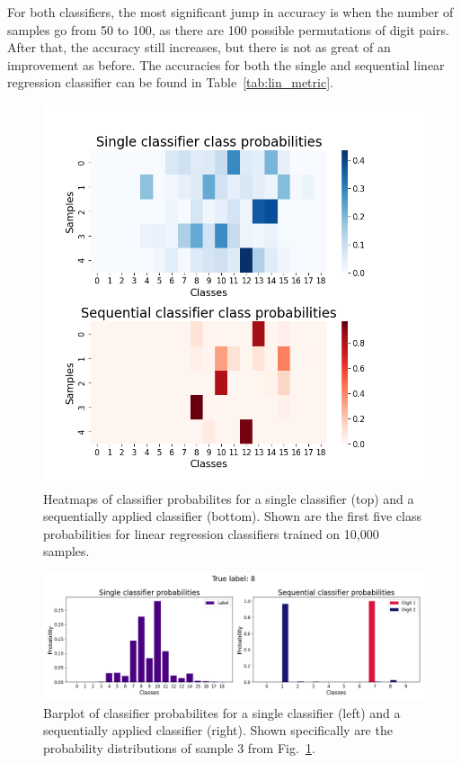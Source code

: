\documentclass[11pt,a4paper]{article}
\begin{document}
For both classifiers, the most significant jump in accuracy is when the number of samples go from 50 to 100, as there are 100 possible permutations of digit pairs. After that, the accuracy still increases, but there is not as great of an improvement as before. The accuracies for both the single and sequential linear regression classifier can be found in Table~\ref{tab:lin_metric}.

\begin{figure}[htb]
    \centering
    \includegraphics[width=\columnwidth, keepaspectratio]{../classifier_heatmap.png}
    \caption{Heatmaps of classifier probabilites for a single classifier (top) and a sequentially applied classifier (bottom). Shown are the first five class probabilities for linear regression classifiers trained on 10,000 samples.}\label{fig:class_prob}
\end{figure}

\begin{figure}[htb]
    \centering
    \includegraphics[width=\columnwidth, keepaspectratio]{../classifer_barplot.png}
    \caption{Barplot of classifier probabilites for a single classifier (left) and a sequentially applied classifier (right). Shown specifically are the probability distributions of sample 3 from Fig.~\ref{fig:class_prob}.}\label{fig:class_prob_bar}
\end{figure}
\end{document}
